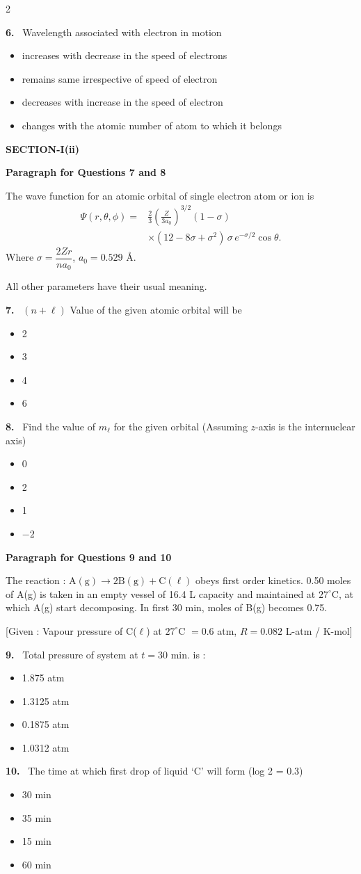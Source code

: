 \documentclass[10pt]{extarticle}
\newcommand{\sect}[1]{\par\smallskip\noindent\textbf{#1}\par}
\newcommand{\qn}[1]{\par\smallskip\noindent\textbf{#1.}~}
\newcommand{\paraq}[2]{\par\smallskip\noindent\textbf{Paragraph for Questions #1 and #2}\par}
\newenvironment{qoptions}{\begin{itemize}[leftmargin=1.8em,itemsep=1pt,topsep=2pt,label={}]}{\end{itemize}}
\newcommand{\opt}[2]{\item[(#1)] #2}
\begin{document}
\begin{multicols}{2}
\qn{6} Wavelength associated with electron in motion
\begin{qoptions}
\opt{A}{increases with decrease in the speed of electrons}
\opt{B}{remains same irrespective of speed of electron}
\opt{C}{decreases with increase in the speed of electron}
\opt{D}{changes with the atomic number of atom to which it belongs}
\end{qoptions}

\sect{SECTION-I(ii)}
\paraq{7}{8}
The wave function for an atomic orbital of single electron atom or ion is
\[\begin{aligned}\Psi(r,\theta,\phi)={}&\frac{2}{3}\left(\frac{Z}{3a_0}\right)^{3/2}(1-\sigma)\\&\times(12-8\sigma+\sigma^2)\,\sigma\, e^{-\sigma/2}\cos\theta.\end{aligned}\]
Where $\sigma=\dfrac{2Zr}{na_0}$, $a_0=0.529$ \AA.

All other parameters have their usual meaning.

\qn{7} $(n+\ell)$ Value of the given atomic orbital will be
\begin{qoptions}
\opt{A}{2}
\opt{B}{3}
\opt{C}{4}
\opt{D}{6}
\end{qoptions}

\qn{8} Find the value of $m_\ell$ for the given orbital (Assuming $z$-axis is the internuclear axis)
\begin{qoptions}
\opt{A}{0}
\opt{B}{2}
\opt{C}{1}
\opt{D}{$-2$}
\end{qoptions}

\paraq{9}{10}
The reaction : $\mathrm{A(g)}\longrightarrow 2\mathrm{B(g)}+\mathrm{C}(\ell)$ obeys first order kinetics. 0.50 moles of A(g) is taken in an empty vessel of 16.4 L capacity and maintained at $27^\circ$C, at which A(g) start decomposing. In first 30 min, moles of B(g) becomes 0.75.

[Given : Vapour pressure of C($\ell$) at $27^\circ$C $=0.6$ atm, $R=0.082$ L-atm / K-mol]

\qn{9} Total pressure of system at $t=30$ min. is :
\begin{qoptions}
\opt{A}{1.875 atm}
\opt{B}{1.3125 atm}
\opt{C}{0.1875 atm}
\opt{D}{1.0312 atm}
\end{qoptions}

\qn{10} The time at which first drop of liquid `C' will form (log 2 = 0.3)
\begin{qoptions}
\opt{A}{30 min}
\opt{B}{35 min}
\opt{C}{15 min}
\opt{D}{60 min}
\end{qoptions}


\end{multicols}
\end{document}
